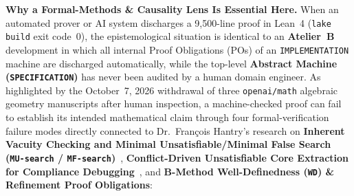 \documentclass[11pt, a4paper]{article}
\theoremstyle{definition}
\theoremstyle{remark}
\begin{document}
\noindent \textbf{Why a Formal-Methods \& Causality Lens Is Essential Here.}
When an automated prover or AI system discharges a 9,500-line proof in Lean~4 (\texttt{lake build} exit code~$0$), the epistemological situation is identical to an \textbf{Atelier~B} development in which all internal Proof Obligations (POs) of an \texttt{IMPLEMENTATION} machine are discharged automatically, while the top-level \textbf{Abstract Machine (\texttt{SPECIFICATION})} has never been audited by a human domain engineer. As highlighted by the October~7, 2026 withdrawal of three \texttt{openai/math} algebraic geometry manuscripts after human inspection, a machine-checked proof can fail to establish its intended mathematical claim through four formal-verification failure modes directly connected to Dr.\ Fran\c{c}ois Hantry's research on \textbf{Inherent Vacuity Checking and Minimal Unsatisfiable/Minimal False Search (\texttt{MU-search} / \texttt{MF-search})}~\cite{HHS12}, \textbf{Conflict-Driven Unsatisfiable Core Extraction for Compliance Debugging}~\cite{HH11}, and \textbf{B-Method Well-Definedness (\texttt{WD}) \& Refinement Proof Obligations}:
\end{document}
